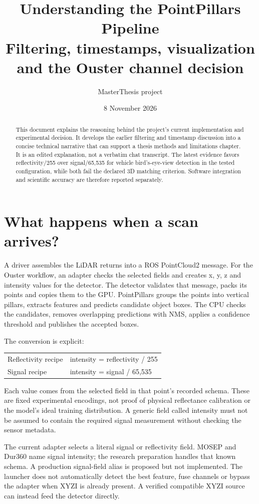 \documentclass[11pt,a4paper]{article}
\title{Understanding the PointPillars Pipeline\\
\large Filtering, timestamps, visualization and the Ouster channel decision}
\author{MasterThesis project}
\date{8 November 2026}
\begin{document}
\maketitle
\begin{abstract}
This document explains the reasoning behind the project's current implementation
and experimental decision. It develops the earlier filtering and timestamp
discussion into a concise technical narrative that can support a thesis methods
and limitations chapter. It is an edited explanation, not a verbatim chat
transcript. The latest evidence favors reflectivity/255 over signal/65,535 for
vehicle bird's-eye-view detection in the tested configuration, while both fail
the declared 3D matching criterion. Software integration and scientific accuracy
are therefore reported separately.
\end{abstract}
\tableofcontents
\newpage

\section{What happens when a scan arrives?}
A driver assembles the LiDAR returns into a ROS PointCloud2 message. For the
Ouster workflow, an adapter checks the selected fields and creates x, y, z and
intensity values for the detector. The detector validates that message, packs
its points and copies them to the GPU. PointPillars groups the points into
vertical pillars, extracts features and predicts candidate object boxes.
The CPU checks the candidates, removes overlapping predictions with NMS,
applies a confidence threshold and publishes the accepted boxes.

The conversion is explicit:
\begin{center}
\begin{tabular}{ll}
Reflectivity recipe & intensity = reflectivity / 255 \\
Signal recipe & intensity = signal / 65,535
\end{tabular}
\end{center}
Each value comes from the selected field in that point's recorded schema.
These are fixed experimental encodings, not proof of physical reflectance
calibration or the model's ideal training distribution. A generic field called
intensity must not be assumed to contain the required signal measurement without
checking the sensor metadata.

The current adapter selects a literal signal or reflectivity field. MOSEP and
Dur360 name signal intensity; the research preparation handles that known schema.
A production signal-field alias is proposed but not implemented. The launcher
does not automatically detect the best feature, fuse channels or bypass the
adapter when XYZI is already present. A verified compatible XYZI source can
instead feed the detector directly.
\end{document}
